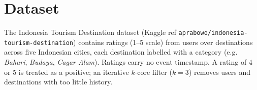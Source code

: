 \section{Dataset}
The Indonesia Tourism Destination dataset (Kaggle ref
\texttt{aprabowo/indonesia-tourism-destination}) contains ratings (1--5
scale) from users over destinations across five Indonesian cities, each
destination labelled with a category (e.g. \emph{Bahari}, \emph{Budaya},
\emph{Cagar Alam}). Ratings carry no event timestamp. A rating of 4 or 5 is
treated as a positive; an iterative $k$-core filter ($k=3$) removes users
and destinations with too little history.
